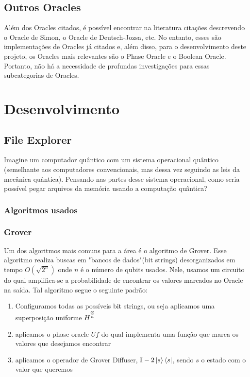\documentclass{article}
\newcommand{\tens}[1]{%
	\mathbin{\mathop{\otimes}\limits_{#1}}%
}
\begin{document}
\subsection{Outros Oracles}

Além dos Oracles citados, é possível encontrar na literatura citações descrevendo o Oracle de Simon, o Oracle de Deutsch-Jozsa, etc. No entanto, esses são implementações de Oracles já citados e, além disso, para o desenvolvimento deste projeto, os Oracles mais relevantes são o Phase Oracle e o Boolean Oracle. Portanto, não há a necessidade de profundas investigações para essas subcategorias de Oracles.


\section{Desenvolvimento}
\subsection{File Explorer} \label{file-explorer}

Imagine um computador quântico com um sistema operacional quântico (semelhante aos computadores convencionais, mas dessa vez seguindo as leis da mecânica quântica). Pensando nas partes desse sistema operacional, como seria possível pegar arquivos da memória usando a computação quântica?


\subsubsection{Algoritmos usados}

\subsubsection{Grover}
Um dos algoritmos mais comuns para a área é o algoritmo de Grover. Esse algoritmo realiza buscas em "bancos de dados"(bit strings) desorganizados em tempo $O(\sqrt{2^n})$ onde $n$ é o número de qubits usados. Nele, usamos um circuito do qual amplifica-se a probabilidade de encontrar os valores marcados no Oracle na saída.
Tal algoritmo segue o seguinte padrão: \
\begin{enumerate}
	\item{Configuramos todas as possíveis bit strings, ou seja aplicamos uma superposição uniforme $H^{\tens{^n}}$}
	\item{aplicamos o phase oracle $Uf$ do qual implementa uma função que marca os valores que desejamos encontrar}
	\item{aplicamos o operador de Grover Diffuser, $\mathbb{I} - 2 \mathinner{|{s}\rangle}\mathinner{\langle{s}|}$}, sendo $s$ o estado com o valor que queremos
\end{enumerate}
\end{document}
